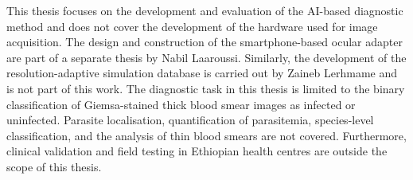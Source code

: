 This thesis focuses on the development and evaluation of the AI-based diagnostic method and does not cover the development of the hardware used for image acquisition. The design and construction of the smartphone-based ocular adapter are part of a separate thesis by Nabil Laaroussi. Similarly, the development of the resolution-adaptive simulation database is carried out by Zaineb Lerhmame and is not part of this work.
The diagnostic task in this thesis is limited to the binary classification of Giemsa-stained thick blood smear images as infected or uninfected. Parasite localisation, quantification of parasitemia, species-level classification, and the analysis of thin blood smears are not covered. Furthermore, clinical validation and field testing in Ethiopian health centres are outside the scope of this thesis.




